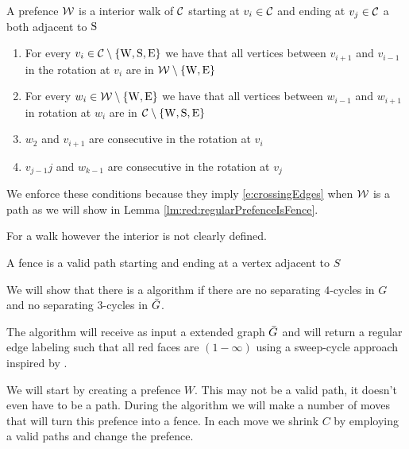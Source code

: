 \begin{defi}[prefence]
A prefence $\mathcal{W}$ is a interior walk of $\mathcal{C}$ starting at $v_i \in \mathcal{C}$ and ending at $v_j \in \mathcal{C}$ a both adjacent to $\mathrm{S}$
\begin{enumerate}
 \renewcommand*{\labelenumi}{(P\arabic{enumi})}%
 \renewcommand*{\theenumi}{(P\arabic{enumi})}%
  \item  For every $v_i \in \mathcal{C} \setminus \left\lbrace {\mathrm{W}, \mathrm{S}, \mathrm{E}} \right\rbrace$ we have that all vertices between $v_{i+1}$ and $v_{i-1}$ in the rotation at $v_i$ are in $\mathcal{W} \setminus \left\lbrace {\mathrm{W}, \mathrm{E}} \right\rbrace$
  \label{p:C}
  \item For every $w_i \in \mathcal{W} \setminus \left\lbrace {\mathrm{W}, \mathrm{E}} \right\rbrace$ we have that all vertices between $w_{i-1}$ and $w_{i+1}$ in rotation at $w_i$ are in $\mathcal{C} \setminus \left\lbrace {\mathrm{W}, \mathrm{S}, \mathrm{E}} \right\rbrace$
  \label{p:W}
  \item $w_2$ and $v_{i+1}$ are consecutive in the rotation at $v_i$
  \label{p:pW}
  \item $v_{j-1}j$ and $w_{k-1}$ are consecutive in the rotation at $v_j$
  \label{p:pE}
\end{enumerate}
\end{defi}


We enforce these conditions because they imply \ref{e:crossingEdges} when $\mathcal{W}$ is a path as we will show in Lemma \ref{lm:red:regularPrefenceIsFence}.

For a walk however the interior is not clearly defined.

\begin{defi}[fence]
A fence is a valid path starting and ending at a vertex adjacent to $S$
\end{defi}



We will show that there is a algorithm if there are no separating $4$-cycles in $G$ and no separating $3$-cycles in $\bar{G}$.


The algorithm will receive as input a extended graph $\bar{G}$ and will return a regular edge labeling such that all red faces are $(1-\infty)$ using a sweep-cycle approach inspired by \Fusy \cite{Fusy2006}.

We will start by creating a prefence $W$. This may not be a valid path, it doesn't even have to be a path. During the algorithm we will make a number of moves that will turn this prefence into a fence. In each move we shrink $C$ by employing a valid paths and change the prefence.

